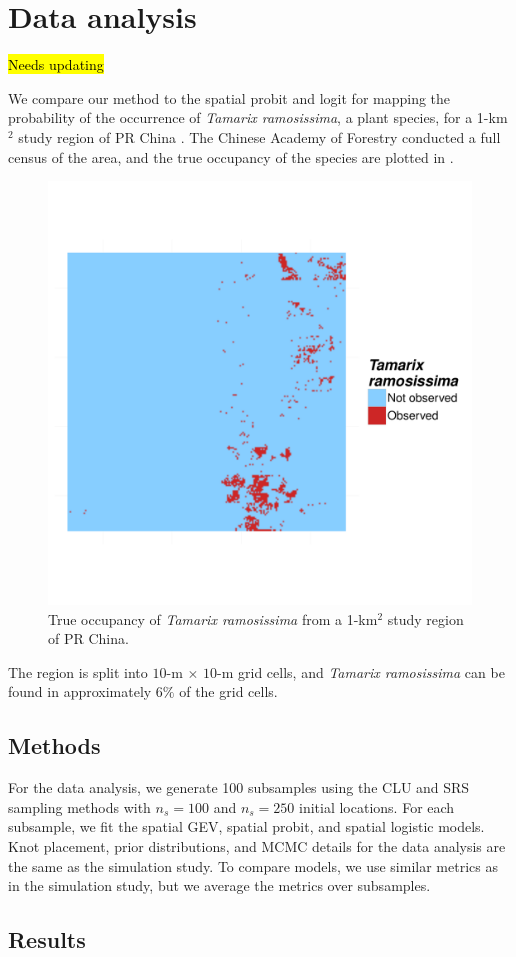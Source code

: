 \section{Data analysis}\label{rbs:dataanalysis}
\hl{Needs updating}

We compare our method to the spatial probit and logit for mapping the probability of the occurrence of \emph{Tamarix ramosissima}, a plant species, for a 1-km$^2$ study region of PR China \citep{Smith2012}.
The Chinese Academy of Forestry conducted a full census of the area, and the true occupancy of the species are plotted in .
\begin{figure}
  \centering
  \includegraphics[width=0.5\linewidth, trim=0 10em 0 10em]{plots/tamarix-census.pdf}
  \caption{True occupancy of \emph{Tamarix ramosissima} from a 1-km$^2$ study region of PR China.}
  \label{rbfig:occupancy}
\end{figure}
The region is split into $10$-m $\times$ $10$-m grid cells, and \emph{Tamarix ramosissima} can be found in approximately $6\%$ of the grid cells.

\subsection{Methods} \label{rbs:datamethods}
For the data analysis, we generate 100 subsamples using the CLU and SRS sampling methods with $n_s = 100$ and $n_s = 250$ initial locations.
For each subsample, we fit the spatial GEV, spatial probit, and spatial logistic models.
Knot placement, prior distributions, and MCMC details for the data analysis are the same as the simulation study.
To compare models, we use similar metrics as in the simulation study, but we average the metrics over subsamples.

\subsection{Results}\label{rbs:dataresults}

